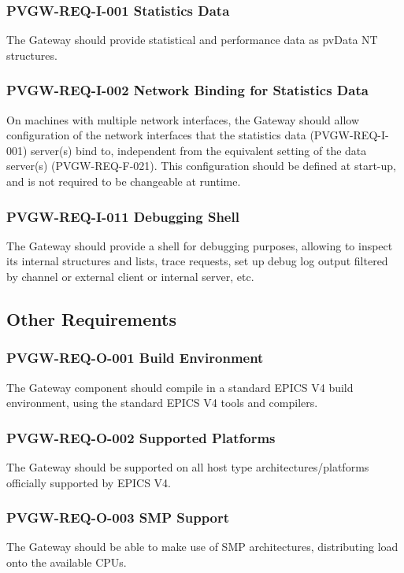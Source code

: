 \documentclass[11pt
  , a4paper
  , article
  , oneside
]{memoir}
\begin{document}
\subsubsection{PVGW-REQ-I-001 Statistics Data}
The Gateway should provide statistical and performance data as pvData NT structures.

\subsubsection{PVGW-REQ-I-002 Network Binding for Statistics Data}
On machines with multiple network interfaces, the Gateway should allow configuration of the network interfaces that the statistics data (PVGW-REQ-I-001) server(s) bind to, independent from the equivalent setting of the data server(s) (PVGW-REQ-F-021). This configuration should be defined at start-up, and is not required to be changeable at runtime.

\subsubsection{PVGW-REQ-I-011 Debugging Shell}
The Gateway should provide a shell for debugging purposes, allowing to inspect its internal structures and lists, trace requests, set up debug log output filtered by channel or external client or internal server, etc.

\subsection{Other Requirements}
\subsubsection{PVGW-REQ-O-001 Build Environment}
The Gateway component should compile in a standard EPICS V4 build environment, using the standard EPICS V4 tools and compilers.

\subsubsection{PVGW-REQ-O-002 Supported Platforms}
The Gateway should be supported on all host type architectures/platforms officially supported by EPICS V4.

\subsubsection{PVGW-REQ-O-003 SMP Support}
The Gateway should be able to make use of SMP architectures, distributing load onto the available CPUs.
\end{document}
